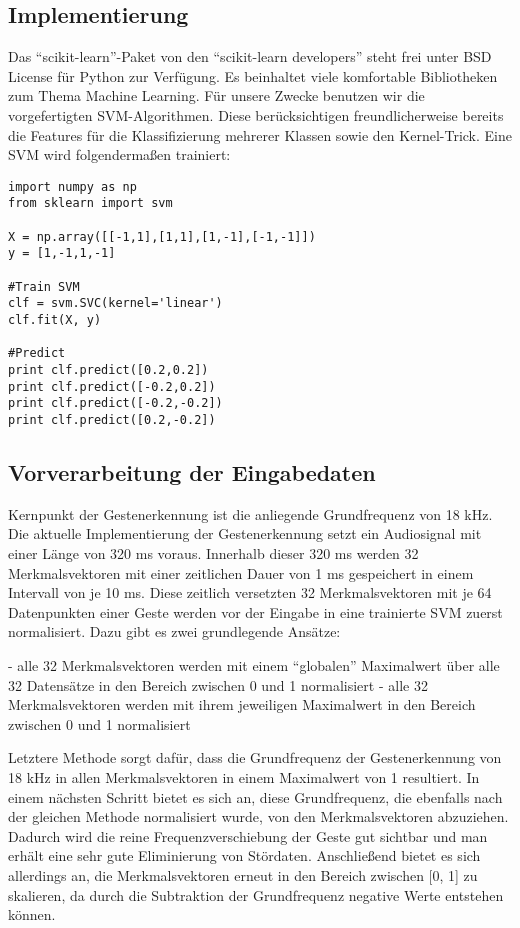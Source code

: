 \newpage

\subsection{Implementierung}

Das “scikit-learn”-Paket von den “scikit-learn developers” steht frei unter BSD License für Python zur Verfügung. Es beinhaltet viele komfortable Bibliotheken zum Thema Machine Learning. Für unsere Zwecke benutzen wir die vorgefertigten SVM-Algorithmen. Diese berücksichtigen freundlicherweise bereits die Features für die Klassifizierung mehrerer Klassen sowie den Kernel-Trick. Eine SVM wird folgendermaßen trainiert:

\begin{lstlisting}
import numpy as np
from sklearn import svm

X = np.array([[-1,1],[1,1],[1,-1],[-1,-1]])
y = [1,-1,1,-1]

#Train SVM
clf = svm.SVC(kernel='linear')
clf.fit(X, y)

#Predict
print clf.predict([0.2,0.2])
print clf.predict([-0.2,0.2])
print clf.predict([-0.2,-0.2])
print clf.predict([0.2,-0.2])
\end{lstlisting}


\subsection{Vorverarbeitung der Eingabedaten}

Kernpunkt der Gestenerkennung ist die anliegende Grundfrequenz von 18 kHz. Die aktuelle Implementierung der Gestenerkennung setzt ein Audiosignal mit einer Länge von 320 ms voraus. Innerhalb dieser 320 ms werden 32 Merkmalsvektoren mit einer zeitlichen Dauer von 1 ms gespeichert in einem Intervall von je 10 ms. Diese zeitlich versetzten 32 Merkmalsvektoren mit je 64 Datenpunkten einer Geste werden vor der Eingabe in eine trainierte SVM zuerst normalisiert. Dazu gibt es zwei grundlegende Ansätze:

- alle 32 Merkmalsvektoren werden mit einem “globalen” Maximalwert über alle 32 Datensätze in den Bereich zwischen 0 und 1 normalisiert\newline
- alle 32 Merkmalsvektoren werden mit ihrem jeweiligen Maximalwert in den Bereich zwischen 0 und 1 normalisiert

Letztere Methode sorgt dafür, dass die Grundfrequenz der Gestenerkennung von 18 kHz in allen Merkmalsvektoren in einem Maximalwert von 1 resultiert. In einem nächsten Schritt bietet es sich an, diese Grundfrequenz, die ebenfalls nach der gleichen Methode normalisiert wurde, von den Merkmalsvektoren abzuziehen. Dadurch wird die reine Frequenzverschiebung der Geste gut sichtbar und man erhält eine sehr gute Eliminierung von Stördaten. Anschließend bietet es sich allerdings an, die Merkmalsvektoren erneut in den Bereich zwischen [0, 1] zu skalieren, da durch die Subtraktion der Grundfrequenz negative Werte entstehen können.



